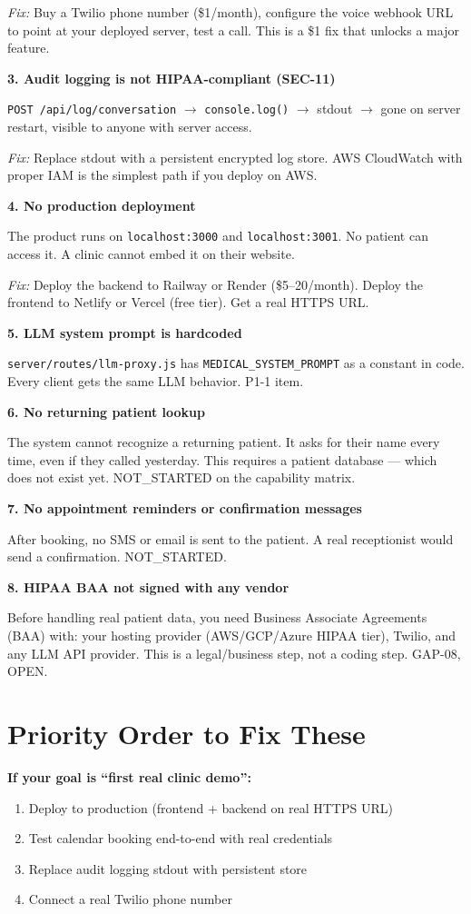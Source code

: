 \documentclass[12pt, a4paper]{report}
\newcommand{\ic}[1]{\texttt{\small\color{accentblue!70!black}#1}}
\begin{document}
\textit{Fix:} Buy a Twilio phone number (\$1/month), configure the voice webhook URL to
point at your deployed server, test a call. This is a \$1 fix that unlocks a major
feature.

\textbf{3. Audit logging is not HIPAA-compliant (SEC-11)}

\ic{POST /api/log/conversation} $\to$ \ic{console.log()} $\to$ stdout $\to$ gone on
server restart, visible to anyone with server access.

\textit{Fix:} Replace stdout with a persistent encrypted log store. AWS CloudWatch with
proper IAM is the simplest path if you deploy on AWS.

\textbf{4. No production deployment}

The product runs on \ic{localhost:3000} and \ic{localhost:3001}. No patient can access
it. A clinic cannot embed it on their website.

\textit{Fix:} Deploy the backend to Railway or Render (\$5--20/month). Deploy the
frontend to Netlify or Vercel (free tier). Get a real HTTPS URL.

\textbf{5. LLM system prompt is hardcoded}

\ic{server/routes/llm-proxy.js} has \ic{MEDICAL\_SYSTEM\_PROMPT} as a constant in code.
Every client gets the same LLM behavior. P1-1 item.

\textbf{6. No returning patient lookup}

The system cannot recognize a returning patient. It asks for their name every time, even
if they called yesterday. This requires a patient database --- which does not exist yet.
NOT\_STARTED on the capability matrix.

\textbf{7. No appointment reminders or confirmation messages}

After booking, no SMS or email is sent to the patient. A real receptionist would send a
confirmation. NOT\_STARTED.

\textbf{8. HIPAA BAA not signed with any vendor}

Before handling real patient data, you need Business Associate Agreements (BAA) with:
your hosting provider (AWS/GCP/Azure HIPAA tier), Twilio, and any LLM API provider.
This is a legal/business step, not a coding step. GAP-08, OPEN.

\section{Priority Order to Fix These}

\textbf{If your goal is ``first real clinic demo'':}
\begin{enumerate}
  \item Deploy to production (frontend + backend on real HTTPS URL)
  \item Test calendar booking end-to-end with real credentials
  \item Replace audit logging stdout with persistent store
  \item Connect a real Twilio phone number
\end{enumerate}
\end{document}

